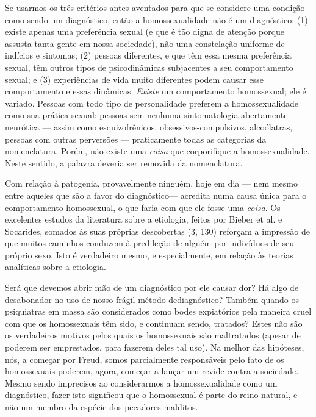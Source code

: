 Se usarmos os três critérios antes aventados para que se considere
uma condição como sendo um diagnóstico, então a homossexualidade não é
um diagnóstico: (1) existe apenas uma preferência sexual (e que é tão
digna de atenção porque assusta tanta gente em nossa sociedade), não
uma constelação uniforme de indícios e sintomas; (2) pessoas
diferentes, e que têm essa mesma preferência sexual, têm outros tipos
de psicodinâmicas subjacentes a seu comportamento sexual; e (3)
experiências de vida muito diferentes podem causar esse comportamento e
essas dinâmicas. \textit{Existe} um comportamento homossexual; ele é
variado. Pessoas com todo tipo de personalidade preferem a
homossexualidade como sua prática sexual: pessoas sem nenhuma
sintomatologia abertamente neurótica --- assim como esquizofrênicos,
obsessivos-compulsivos, alcoólatras, pessoas com outras perversões ---
praticamente todas as categorias da nomenclatura. Porém, não existe uma
\textit{coisa} que corporifique a homossexualidade. Neste sentido, a
palavra deveria ser removida da nomenclatura.

Com relação à patogenia, provavelmente ninguém, hoje em dia --- nem
mesmo entre aqueles que são a favor do diagnóstico\idxdiag[|)] --- acredita numa
causa única para o comportamento homossexual, o que faria com que ele
fosse uma \textit{coisa}. Os excelentes estudos da literatura sobre a
etiologia,\idxhomosetio{} feitos por Bieber\idxbieb{} et al. e Socarides,\idxsocar{} somados às suas
próprias descobertas (3, 130) reforçam a impressão de que muitos
caminhos conduzem à predileção de alguém por indivíduos de seu próprio
sexo. Isto é verdadeiro mesmo, e especialmente, em relação às teorias
analíticas sobre a etiologia.

Será que devemos abrir mão de um diagnóstico por ele causar dor? Há
algo de desabonador no uso de nosso frágil método de\idxdiagcrit[|)] diagnóstico?
Também quando os psiquiatras em massa são considerados como bodes
expiatórios pela maneira cruel com que os homossexuais têm sido, e
continuam sendo, tratados? Estes não são os verdadeiros motivos pelos
quais os homossexuais são maltratados (apesar de poderem ser
emprestados, para fazerem deles tal uso). Na melhor das hipóteses, nós,
a começar por Freud,\idxfreud{} somos parcialmente responsáveis pelo fato de os
homossexuais poderem, agora, começar a lançar um revide contra a
sociedade. Mesmo sendo imprecisos ao considerarmos a homossexualidade
como um diagnóstico, fazer isto significou que o homossexual é parte do
reino natural, e não um membro da espécie dos pecadores malditos.

